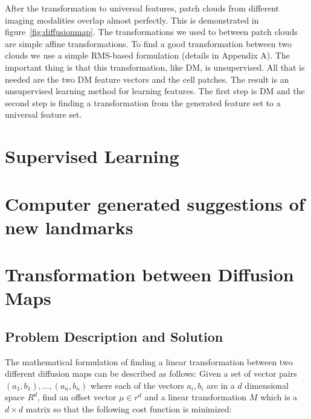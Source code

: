 \documentclass[runningheads]{llncs}
\begin{document}
After the transformation to universal features, patch clouds from
different imaging modalities overlap almost perfectly. This is
demonstrated in figure~\ref{fig:diffusionmap}. 
The transformations we used to between patch clouds are simple affine
transformations. To find a good transformation between two clouds we
use a simple RMS-based formulation (details in Appendix A). The
important thing is that this transformation, like DM, is
unsupervised. All that is needed are the two DM feature vectors and
the cell patches. The result is an unsupervised learning method for
learning features. The first step is DM and the second step is finding
a transformation from the generated feature set to a universal feature
set.

\section{Supervised Learning}

\section{Computer generated suggestions of new landmarks}

 
 

\appendix


\section{Transformation between Diffusion Maps}
\subsection{Problem Description and Solution}
The mathematical formulation of finding a linear transformation between two different diffusion maps can be described as follows: Given a set of vector pairs $(a_1,b_1),\ldots,(a_n,b_n)$ where each of the vectors $a_i,b_i$ are in a $d$ dimensional space $R^d$,  find an offset vector $\mu \in r^d$ and a linear transformation $M$ which is a $d \times d$ matrix so that the following cost function is minimized:
\end{document}
